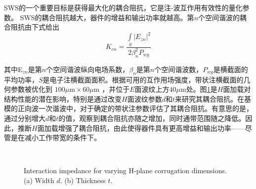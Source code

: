 \documentclass[10pt,a4paper,UTF8]{ctexart}
\begin{document}
SWS的一个重要目标是获得最大化的耦合阻抗，它是注-波互作用有效性的量化参数。 SWS的耦合阻抗越大，器件的增益和输出功率就越高。第$ n $个空间谐波的耦合阻抗由下式给出
\begin{equation} \label{eq:1}
K_{cn}= \frac{\int \limits _S \vert E_{zn}\vert ^2}{2\beta_n^2P_{wg}}
\end{equation}

其中$ $E$_{zn} $是第$ n $个空间谐波纵向电场系数，$ \beta_n $是第$ n $个空间谐波数，$ P_{wg} $是横截面的平均功率，$ S $是电子注横截面面积。根据可用的互作用场强度，带状注横截面的几何参数被优化到 $100 \mu \textrm{m} \times 60 \mu \textrm{m}$ ，并位于$E$面波纹上方$ 40 \mu\textrm{m} $处。图\ref{fig5}是$ H $面加载对结构性能的潜在影响，特别是通过改变$H$面波纹参数$ d $和$ t $来研究其耦合阻抗。在基模的正向波一次谐波中，对于确定的带状注参数评估了其耦合阻抗。有意思的是，通过分别增大$ d $和$ t $的值，观察到耦合阻抗亦随之增加，同时通带范围随之降低。因此，推断$H$面加载增强了耦合阻抗，由此使得器件具有更高增益和输出功率——尽管是在减小工作带宽的条件下。
\begin{figure}[phtb]
	\centering
	\\
	\caption{Interaction impedance for varying H-plane corrugation dimensions. (a) Width $ d $. (b) Thickness $ t $.}
	\label{fig5}
\end{figure}
\end{document}
